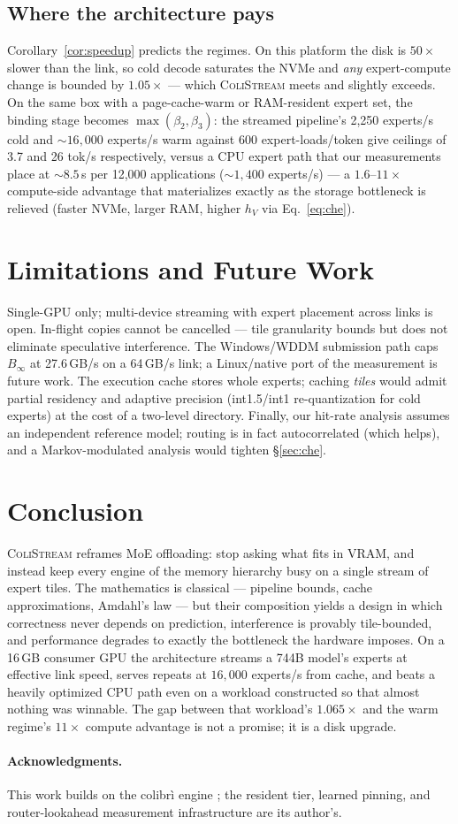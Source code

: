 \documentclass[11pt]{article}
\theoremstyle{definition}
\theoremstyle{remark}
\newcommand{\colistream}{\textsc{ColiStream}}
\begin{document}
\subsection{Where the architecture pays}
Corollary~\ref{cor:speedup} predicts the regimes. On this platform the disk
is $50\times$ slower than the link, so cold decode saturates the NVMe and
\emph{any} expert-compute change is bounded by $1.05\times$ --- which
\colistream{} meets and slightly exceeds. On the same box with a
page-cache-warm or RAM-resident expert set, the binding stage becomes
$\max(\beta_2, \beta_3)$: the streamed pipeline's 2{,}250 experts/s cold and
${\sim}16{,}000$ experts/s warm against 600 expert-loads/token give ceilings
of 3.7 and 26 tok/s respectively, versus a CPU expert path that our
measurements place at ${\sim}8.5$\,s per 12{,}000 applications
(${\sim}1{,}400$ experts/s) --- a $1.6$--$11\times$ compute-side advantage
that materializes exactly as the storage bottleneck is relieved (faster
NVMe, larger RAM, higher $h_V$ via Eq.~\eqref{eq:che}).

\section{Limitations and Future Work}
Single-GPU only; multi-device streaming with expert placement across links
is open. In-flight copies cannot be cancelled --- tile granularity bounds
but does not eliminate speculative interference. The Windows/WDDM submission
path caps $B_\infty$ at 27.6\,GB/s on a 64\,GB/s link; a Linux/native
port of the measurement is future work. The execution cache stores whole
experts; caching \emph{tiles} would admit partial residency and adaptive
precision (int1.5/int1 re-quantization for cold experts) at the cost of a
two-level directory. Finally, our hit-rate analysis assumes an independent
reference model; routing is in fact autocorrelated (which helps), and a
Markov-modulated analysis would tighten \S\ref{sec:che}.

\section{Conclusion}
\colistream{} reframes MoE offloading: stop asking what fits in VRAM, and
instead keep every engine of the memory hierarchy busy on a single stream of
expert tiles. The mathematics is classical --- pipeline bounds, cache
approximations, Amdahl's law --- but their composition yields a design in
which correctness never depends on prediction, interference is provably
tile-bounded, and performance degrades to exactly the bottleneck the
hardware imposes. On a 16\,GB consumer GPU the architecture streams a 744B
model's experts at effective link speed, serves repeats at
$16{,}000$ experts/s from cache, and beats a heavily optimized CPU path even
on a workload constructed so that almost nothing was winnable. The gap
between that workload's $1.065\times$ and the warm regime's $11\times$
compute advantage is not a promise; it is a disk upgrade.

\paragraph{Acknowledgments.} This work builds on the colibr\`i engine
\citep{colibri2026}; the resident tier, learned pinning, and router-lookahead
measurement infrastructure are its author's.



\end{document}
